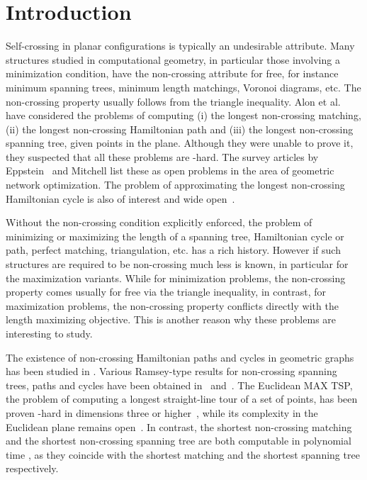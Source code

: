 \documentclass[proceedings]{stacs}
\begin{document}
\maketitle

\section{Introduction} \label{sec:intro}

Self-crossing in planar configurations is typically an undesirable
attribute. Many structures studied in computational geometry, in particular
those involving a minimization condition, have the non-crossing
attribute for free, for instance minimum spanning trees, minimum
length matchings, Voronoi diagrams, etc.
The non-crossing property usually follows from the triangle inequality.
Alon et al.~\cite{ARS95} have considered the problems of computing
{\rm (i)} the longest non-crossing matching,
{\rm (ii)} the longest non-crossing Hamiltonian path and
{\rm (iii)} the longest non-crossing spanning tree,
given  points in the plane. Although they were unable to prove it,
they suspected that all these problems are -hard.
The survey articles by Eppstein~\cite[pp. 439]{Ep00} and Mitchell
\cite[pp. 680]{Mi00} list these as open problems in the area of
geometric network optimization.
The problem of approximating the longest non-crossing
Hamiltonian cycle is also of interest and wide open~\cite[pp. 338]{BE97}.

Without the non-crossing condition explicitly enforced, the problem of
minimizing or maximizing the length of a spanning tree, Hamiltonian
cycle or path, perfect matching, triangulation, etc. has a rich history.
However if such structures are required to be non-crossing much less
is known, in particular for the maximization variants.
While for minimization problems, the non-crossing property comes
usually for free via the triangle inequality, in contrast, for
maximization problems, the non-crossing property conflicts directly
with the length maximizing objective. This is another reason why
these problems are interesting to study.

\medskip
{} The existence of non-crossing Hamiltonian
paths and cycles in geometric graphs has been studied in
\cite{ACF+08,CDJK07}.
Various Ramsey-type results for  non-crossing spanning trees, paths
and cycles have been obtained in~\cite{KPT97} and~\cite{KPTV98}.
The Euclidean MAX TSP, the problem of computing a longest
straight-line tour of a set of points, has been proven -hard in
dimensions three or higher~\cite{Fe99}, while its complexity in the
Euclidean plane remains open~\cite{Mi00}.
In contrast, the shortest non-crossing matching and the
shortest non-crossing spanning tree are both computable in polynomial time
\cite{Ep00,Mi00}, as they coincide with the shortest matching and the
shortest spanning tree respectively.
\end{document}

